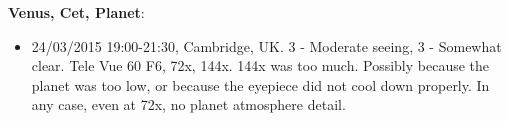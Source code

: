 {\bf Venus, Cet, Planet}:
\begin{itemize}
\item 24/03/2015 19:00-21:30, Cambridge, UK. 3 - Moderate seeing, 3 - Somewhat clear. Tele Vue 60 F6, 72x, 144x. 144x was too much. Possibly because the planet was too low, or because the eyepiece did not cool down properly. In any case, even at 72x, no planet atmosphere detail. 
\end{itemize}
